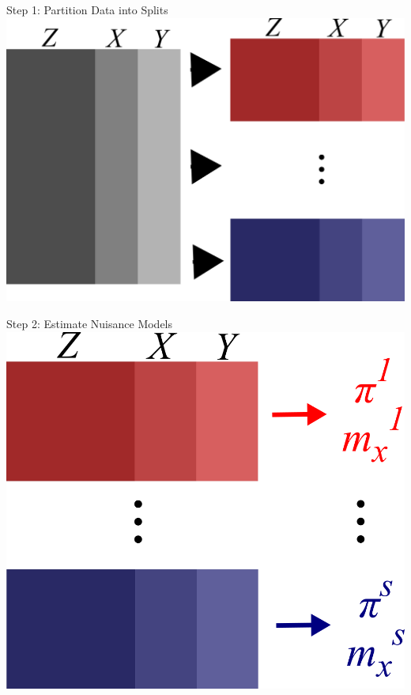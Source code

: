\documentclass{beamer}
\begin{document}
\begin{frame}{Step 1: Partition Data into Splits}
	\centering
	\includegraphics[scale=0.7]{images/step1_split.png}
\end{frame}

\begin{frame}{Step 2: Estimate Nuisance Models}
	\centering
	\includegraphics[scale=0.7]{images/step2_estimate.png}
\end{frame}
\end{document}
